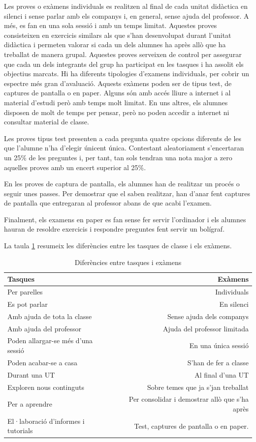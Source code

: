 \documentclass[catalan, a4paper, 12pt, titlepage]{article}
\begin{document}
Les proves o exàmens individuals es realitzen al final de cada unitat didàctica en silenci i sense parlar amb els companys i, en general, sense ajuda del professor.
A més, es fan en una sola sessió i amb un temps limitat.
Aquestes proves consisteixen en exercicis similars als que s'han desenvolupat durant l'unitat didàctica i permeten valorar si cada un dels alumnes ha après allò que ha treballat de manera grupal.
Aquestes proves serveixen de control per assegurar que cada un dels integrants del grup ha participat en les tasques i ha assolit els objectius marcats.
Hi ha diferents tipologies d'examens individuals, per cobrir un espectre més gran d'avaluació. Aquests exàmens poden ser de tipus test, de captures de pantalla o en paper. 
Alguns són amb accés lliure a internet i al material d'estudi però amb temps molt limitat.
En uns altres, els alumnes disposen de molt de temps per pensar, però no poden accedir a internet ni consultar material de classe.

Les proves tipus test presenten a cada pregunta quatre opcions diferents de les que l'alumne n'ha d'elegir únicent única.
Contestant aleatoriament s'encertaran un 25\% de les preguntes i, per tant, tan sols tendran una nota major a zero aquelles proves amb un encert superior al 25\%.

En les proves de captura de pantalla, els alumnes han de realitzar un procés o seguir unes passes.
Per demostrar que el saben realitzar, han d'anar fent captures de pantalla que entregaran al professor abans de que acabi l'examen.

Finalment, els examens en paper es fan sense fer servir l'ordinador i els alumnes hauran de resoldre exercicis i respondre preguntes fent servir un bolígraf.

La taula \ref{tab:tasquesiexamens} resumeix les diferències entre les tasques de classe i els exàmens.

\begin{table}
	\small
        \centering
        \begin{tabular}{lr}
        Tasques & Exàmens\\
        \hline
	Per parelles & Individuals\\
		Es pot parlar & En silenci \\
		Amb ajuda de tota la classe &Sense ajuda dels companys\\
		Amb ajuda del professor & Ajuda del professor limitada\\
		Poden allargar-se més d'una sessió & En una única sessió\\
		Poden acabar-se a casa & S'han de fer a classe\\
		Durant una UT & Al final d'una UT \\
		Exploren nous continguts & Sobre temes que ja s'jan treballat\\
		Per a aprendre & Per consolidar i demostrar allò que s'ha après\\
		El·laboració d'informes i tutorials & Test, captures de pantalla o en paper.

\end{tabular}
        \caption{Diferències entre tasques i exàmens} \label{tab:tasquesiexamens}
\end{table}
\end{document}
